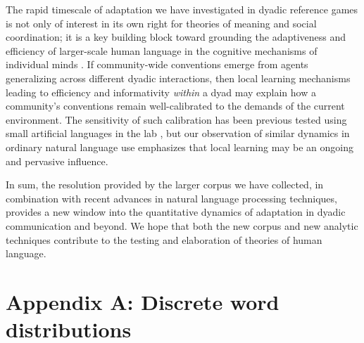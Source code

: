 \documentclass[alpha-refs]{wiley-article}
\begin{document}
The rapid timescale of adaptation we have investigated in dyadic reference games is not only of interest in its own right for theories of meaning and social coordination; it is a key building block toward grounding the adaptiveness and efficiency of larger-scale human language in the cognitive mechanisms of individual minds \citep{KirbyTamarizCornishSmith15_CompressionCommunication,gibson2019efficiency}.
If community-wide conventions emerge from agents generalizing across different dyadic interactions, then local learning mechanisms leading to efficiency and informativity \emph{within} a dyad may explain how a community's conventions remain well-calibrated to the demands of the current environment.
The sensitivity of such calibration has been previous tested using small artificial languages in the lab \cite[e.g.][]{WintersKirbySmith14_LanguagesAdapt,hawkins_emerging_abstractions_2018}, but our observation of similar dynamics in ordinary natural language use emphasizes that local learning may be an ongoing and pervasive influence. 

In sum, the resolution provided by the larger corpus we have collected, in combination with recent advances in natural language processing techniques, provides a new window into the quantitative dynamics of adaptation in dyadic communication and beyond. 
We hope that both the new corpus and new analytic techniques contribute to the testing and elaboration of theories of human language.

%

\printendnotes



\section*{Appendix A: Discrete word distributions}
\end{document}

